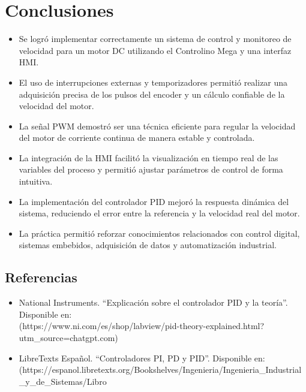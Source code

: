 \documentclass[journal, onecolumn]{IEEEtran}
\begin{document}
\section{Conclusiones}


\begin{itemize}
    \item Se logró implementar correctamente un sistema de control y monitoreo de velocidad para un motor DC utilizando el Controlino Mega y una interfaz HMI.

    \item El uso de interrupciones externas y temporizadores permitió realizar una adquisición precisa de los pulsos del encoder y un cálculo confiable de la velocidad del motor.

    \item La señal PWM demostró ser una técnica eficiente para regular la velocidad del motor de corriente continua de manera estable y controlada.

    \item La integración de la HMI facilitó la visualización en tiempo real de las variables del proceso y permitió ajustar parámetros de control de forma intuitiva.

    \item La implementación del controlador PID mejoró la respuesta dinámica del sistema, reduciendo el error entre la referencia y la velocidad real del motor.

    \item La práctica permitió reforzar conocimientos relacionados con control digital, sistemas embebidos, adquisición de datos y automatización industrial.
\end{itemize}


\subsection{Referencias}

\begin{itemize}
    \item National Instruments. ``Explicación sobre el controlador PID y la teoría''. Disponible en: \\
    [NI PID Theory Explained](https://www.ni.com/es/shop/labview/pid-theory-explained.html?utm_source=chatgpt.com)
    
    \item LibreTexts Español. ``Controladores PI, PD y PID''. Disponible en: \\
    [LibreTexts Controladores PID](https://espanol.libretexts.org/Bookshelves/Ingenieria/Ingenieria_Industrial_y_de_Sistemas/Libro%
\end{itemize}
\end{document}
